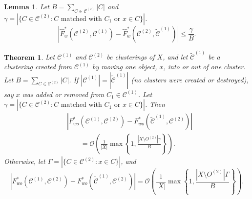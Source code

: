 \documentclass[10pt,a4paper]{amsart}
\newtheorem{thm}{Theorem}
\newtheorem{lem}{Lemma}
\newcommand{\bigO}{\mathcal{O}}
\newcommand\cCone{\mathcal{C}^{(1)}}
\newcommand\cCtwo{\mathcal{C}^{(2)}}
\newcommand\tcCone{\tilde{\mathcal{C}}^{(1)}}
\begin{document}
\begin{lem} \label{lem:three}
    Let $B = \sum_{C \in \cCtwo} |C|$ and $\gamma = \left| \{ C \in \cCtwo : C \text{ matched with } C_1 \text{ or } x \in C\} \right|$.
    \begin{equation*}
        \left| \hat{F}^*_w(\cCtwo, \cCone) - \hat{F}^*_w(\cCtwo, \tcCone) \right| \leq \frac{ \gamma }{B}.
    \end{equation*}
\end{lem}

\begin{thm}\label{thm:robust}
    Let $\cCone$ and $\cCtwo$ be clusterings of $X$, and let $\tcCone$ be a clustering created from $\cCone$ by moving one object, $x$, into or out of one cluster.
    Let $B = \sum_{C \in \cCtwo} |C|$.
    If $|\cCone| = |\tcCone|$ (no clusters were created or destroyed), say $x$ was added or removed from $C_1 \in \cCone$.
    Let $\gamma = |\{C \in \cCtwo : C \text{ matched with } C_1 \text{ or } x \in C\}|$.
    Then
    \begin{align*}
    &\left| F^*_{wo}(\cCone, \cCtwo) - F^*_{wo}(\tcCone, \cCtwo) \right|\\
    &\qquad = \bigO \left( \frac{1}{|X|} \max \left\{ 1, \frac{|X \setminus O^{(2)}| \gamma}{B} \right\} \right).
    \end{align*}
    Otherwise, let $\Gamma = |\{C \in \cCtwo : x \in C\}|$, and
    \begin{equation*}
            \left| F^*_{wo}(\cCone, \cCtwo) - F^*_{wo}(\tcCone, \cCtwo) \right| = \bigO \left( \frac{1}{|X|} \max \left\{ 1, \frac{|X \setminus O^{(2)}| \Gamma}{B} \right\} \right).
    \end{equation*}
\end{thm}
\end{document}
